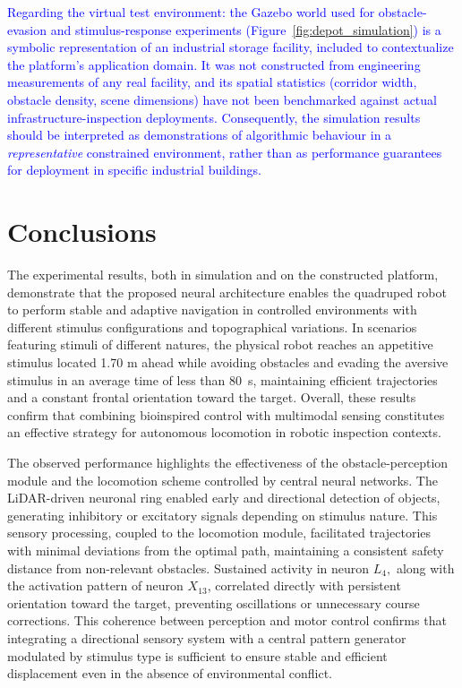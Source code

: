\documentclass[preprint,12pt]{elsarticle}
\newcommand{\revblue}[1]{\textcolor{blue}{#1}}
\begin{document}
\revblue{%
Regarding the virtual test environment: the Gazebo world used for
obstacle-evasion and stimulus-response experiments
(Figure~\ref{fig:depot_simulation}) is a symbolic representation
of an industrial storage facility, included to contextualize
the platform's application domain.
It was not constructed from engineering measurements of any
real facility, and its spatial statistics (corridor width,
obstacle density, scene dimensions) have not been benchmarked
against actual infrastructure-inspection deployments.
Consequently, the simulation results should be interpreted as
demonstrations of algorithmic behaviour in a \emph{representative}
constrained environment, rather than as performance guarantees
for deployment in specific industrial buildings.%
}

\section{Conclusions}

The experimental results, both in simulation and on the constructed platform, demonstrate that the proposed neural architecture enables the quadruped robot to perform stable and adaptive navigation in controlled environments with different stimulus configurations and topographical variations. In scenarios featuring stimuli of different natures, the physical robot reaches an appetitive stimulus located 1.70 m ahead while avoiding obstacles and evading the aversive stimulus in an average time of less than 80~s, maintaining efficient trajectories and a constant frontal orientation toward the target. Overall, these results confirm that combining bioinspired control with multimodal sensing constitutes an effective strategy for autonomous locomotion in robotic inspection contexts. 

The observed performance highlights the effectiveness of the obstacle-perception module and the locomotion scheme controlled by central neural networks. The LiDAR-driven neuronal ring enabled early and directional detection of objects, generating inhibitory or excitatory signals depending on stimulus nature. This sensory processing, coupled to the locomotion module, facilitated trajectories with minimal deviations from the optimal path, maintaining a consistent safety distance from non-relevant obstacles. Sustained activity in neuron $L_4,$ along with the activation pattern of neuron $X_{13}$, correlated directly with persistent orientation toward the target, preventing oscillations or unnecessary course corrections. This coherence between perception and motor control confirms that integrating a directional sensory system with a central pattern generator modulated by stimulus type is sufficient to ensure stable and efficient displacement even in the absence of environmental conflict. 
\end{document}
